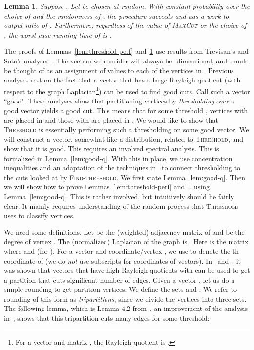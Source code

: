 \documentclass[11pt]{article}
\newtheorem{Lem}[theorem]{Lemma}
\newcommand\Threshold{\textsc{Threshold}\xspace}
\newcommand\Find{\textsc{Find-threshold}\xspace}
\def\maxcut{\textsc{MaxCut}\xspace}
\begin{document}
\begin{Lem} \label{lem:find} Suppose . Let  be chosen at random.
With constant probability over the choice of  and the randomness of
, the procedure  succeeds and has a work to output ratio of
. Furthermore, regardless of the
value of \maxcut or the choice of , the worst-case running time of
 is .
\end{Lem}

The proofs of Lemmas~\ref{lem:threshold-perf} and~\ref{lem:find} use
results from Trevisan's and Soto's analyses~\cite{Tre09,Sot09}.
The vectors we consider will always be -dimensional,
and should be thought of as an assignment of values to each of the  vertices
in .
Previous analyses rest on the fact that a vector
that has a large Rayleigh quotient
(with respect to the graph Laplacian\footnote{For a vector 
and matrix , the Rayleigh quotient is .}) can be
used to find good cuts. Call such a vector ``good".
These analyses show that partitioning vertices by \emph{thresholding} over
a good vector  yields a good cut. This means that for some threshold ,
vertices  with  are placed in  and those with 
are placed in .
We would like to show that {\Threshold} is
essentially performing such a thresholding on some good vector. We will construct a vector,
somewhat like a distribution, related to {\Threshold}, and show that it is
good. This requires an involved spectral
analysis. This is formalized in Lemma~\ref{lem:good-q}. With this
in place, we use concentration inequalities and an adaptation of the techniques
in~\cite{Sot09} to connect thresholding to the cuts looked at by {\Find}.
We first state Lemma~\ref{lem:good-q}. Then we will show how
to prove Lemmas~\ref{lem:threshold-perf} and~\ref{lem:find} using Lemma~\ref{lem:good-q}.
This is rather involved, but intuitively should be fairly clear.
It mainly requires understanding of
the random process that {\Threshold} uses to classify vertices.

We need some
definitions. Let  be the (weighted) adjacency matrix of  and 
be the degree of vertex .  The (normalized) Laplacian of the graph is . Here  is the matrix where  and
 (for ). For a vector  and coordinate/vertex , we use 
to denote the th coordinate of  (we do \emph{not} use subscripts
for coordinates of vectors).
In~\cite{Tre09} and~\cite{Sot09}, it was shown
that vectors that have high Rayleigh quotients with 
can be used to get a
partition that cuts significant number of edges. Given a vector , let us do
a simple rounding to get partition vertices. We define the sets  and . We refer to
rounding of this form as \emph{tripartitions}, since we divide the vertices
into three sets. The following lemma, which is Lemma 4.2 from~\cite{Sot09}, an
improvement of the analysis in~\cite{Tre09}, shows that this tripartition cuts
many edges for some threshold:
\end{document}

